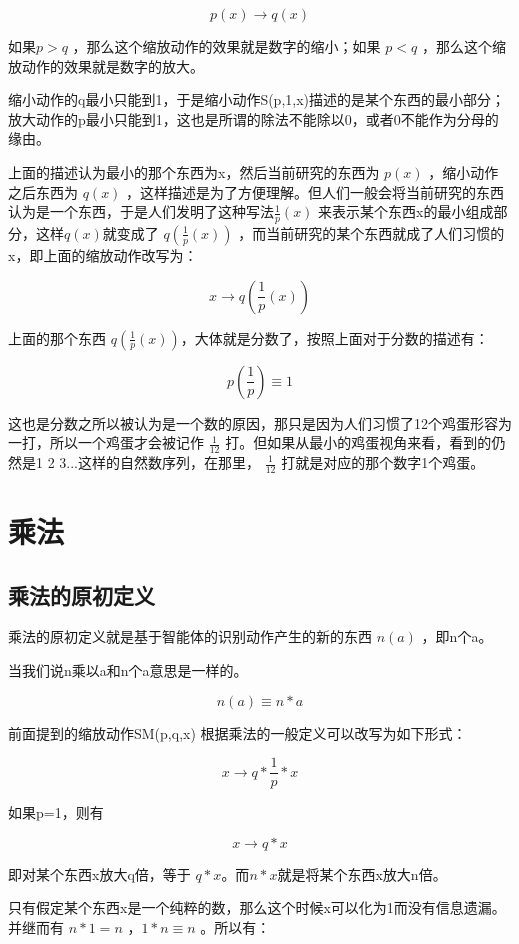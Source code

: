 \documentclass[12pt,oneside]{book}
\begin{document}
\[
p(x) \to q(x)   
\]

如果$p>q$ ，那么这个缩放动作的效果就是数字的缩小；如果 $p<q$ ，那么这个缩放动作的效果就是数字的放大。

缩小动作的q最小只能到1，于是缩小动作S(p,1,x)描述的是某个东西的最小部分；放大动作的p最小只能到1，这也是所谓的除法不能除以0，或者0不能作为分母的缘由。

上面的描述认为最小的那个东西为x，然后当前研究的东西为 $p(x)$ ，缩小动作之后东西为 $q(x)$ ，这样描述是为了方便理解。但人们一般会将当前研究的东西认为是一个东西，于是人们发明了这种写法$\frac{1}{p}(x)$ 来表示某个东西x的最小组成部分，这样$q(x)$就变成了 $q(\frac{1}{p}(x))$ ，而当前研究的某个东西就成了人们习惯的x，即上面的缩放动作改写为：


\[
x \to q(\frac{1}{p}(x))  
\]

上面的那个东西 $q(\frac{1}{p}(x))$，大体就是分数了，按照上面对于分数的描述有：

\begin{equation}
p(\frac{1}{p}) \equiv 1
\end{equation}

这也是分数之所以被认为是一个数的原因，那只是因为人们习惯了12个鸡蛋形容为一打，所以一个鸡蛋才会被记作 $\frac{1}{12}$ 打。但如果从最小的鸡蛋视角来看，看到的仍然是1 2 3...这样的自然数序列，在那里， $\frac{1}{12}$ 打就是对应的那个数字1个鸡蛋。



\section{乘法}
\subsection{乘法的原初定义}
乘法的原初定义就是基于智能体的识别动作产生的新的东西 $n(a)$ ，即n个a。

当我们说n乘以a和n个a意思是一样的。

\[
n(a) \equiv n*a
\]

前面提到的缩放动作SM(p,q,x) 根据乘法的一般定义可以改写为如下形式：

\[
x \to q*\frac{1}{p}*x
\]

如果p=1，则有

\[
x \to q*x
\]

即对某个东西x放大q倍，等于 $q*x$。而$n*x$就是将某个东西x放大n倍。

只有假定某个东西x是一个纯粹的数，那么这个时候x可以化为1而没有信息遗漏。并继而有 $n*1 = n$ ，$1*n \equiv n$ 。所以有：
\end{document}
